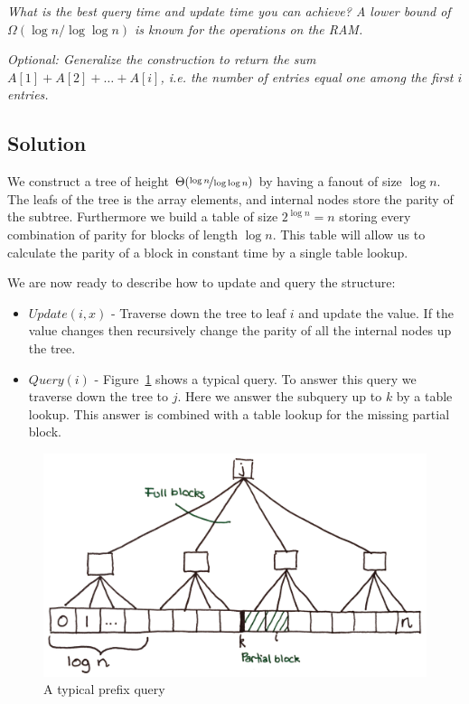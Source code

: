 \documentclass[a4paper,oneside,article,11pt]{memoir}
\begin{document}
\textit{What is the best query time and update time you can achieve? A lower bound of $\Omega(\log n/\log\log n)$ is known for the operations on the RAM.}

\textit{Optional: Generalize the construction to return the sum $A[1]+A[2]+\dots+A[i]$, i.e. the number of entries equal one among the first $i$ entries.}

\subsection{Solution}
We construct a tree of height $\Theta(\nicefrac{\log n}{\log\log n})$ by having a fanout of size $\log n$. The leafs of the tree is the array elements, and internal nodes store the parity of the subtree. Furthermore we build a table of size $2^{\log n} = n$ storing every combination of parity for blocks of length $\log n$. This table will allow us to calculate the parity of a block in constant time by a single table lookup.

We are now ready to describe how to update and query the structure:
\begin{itemize}
	\item{$Update(i, x)$ - Traverse down the tree to leaf $i$ and update the value. If the value changes then recursively change the parity of all the internal nodes up the tree.}
	\item{$Query(i)$ - Figure~\ref{fig:pre_query} shows a typical query. To answer this query we traverse down the tree to $j$. Here we answer the subquery up to $k$ by a table lookup. This answer is combined with a table lookup for the missing partial block.}
\end{itemize}

\begin{figure}
\includegraphics[width=\textwidth]{../figures/pre_query.png}
\caption{\label{fig:pre_query}A typical prefix query}
\end{figure}
\end{document}
